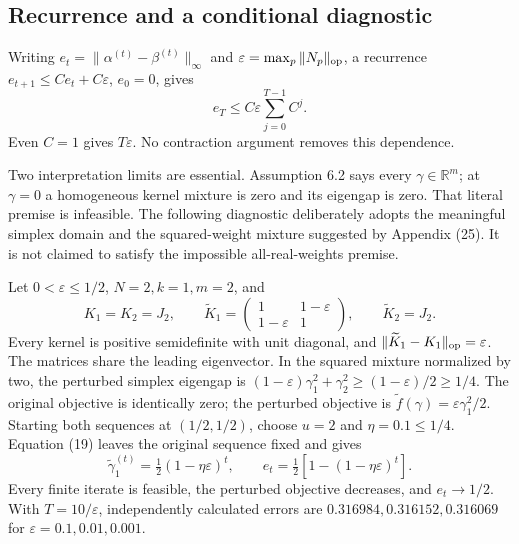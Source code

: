 \documentclass[10pt]{article}
\begin{document}
\subsection*{Recurrence and a conditional diagnostic}
Writing \(e_t=\|\alpha^{(t)}-\beta^{(t)}\|_\infty\) and \(\varepsilon=\max_p\|N_p\|_{\rm op}\), a recurrence \(e_{t+1}\leq C e_t+C\varepsilon\), \(e_0=0\), gives \[e_T\leq C\varepsilon\sum_{j=0}^{T-1}C^j.\] Even \(C=1\) gives \(T\varepsilon\). No contraction argument removes this dependence.\par
Two interpretation limits are essential. Assumption 6.2 says every \(\gamma\in\mathbb R^m\); at \(\gamma=0\) a homogeneous kernel mixture is zero and its eigengap is zero. That literal premise is infeasible. The following diagnostic deliberately adopts the meaningful simplex domain and the squared-weight mixture suggested by Appendix (25). It is not claimed to satisfy the impossible all-real-weights premise.\par
Let \(0<\varepsilon\leq1/2\), \(N=2,k=1,m=2\), and \[K_1=K_2=J_2,\qquad
 \widetilde K_1=\begin{pmatrix}1&1-\varepsilon\\1-\varepsilon&1\end{pmatrix},
 \qquad \widetilde K_2=J_2.\] Every kernel is positive semidefinite with unit diagonal, and \(\|\widetilde K_1-K_1\|_{\rm op}=\varepsilon\). The matrices share the leading eigenvector. In the squared mixture normalized by two, the perturbed simplex eigengap is \((1-\varepsilon)\gamma_1^2+\gamma_2^2\geq(1-\varepsilon)/2\geq1/4\). The original objective is identically zero; the perturbed objective is \(\widetilde f(\gamma)=\varepsilon\gamma_1^2/2\). Starting both sequences at \((1/2,1/2)\), choose \(u=2\) and \(\eta=0.1\leq1/4\). Equation (19) leaves the original sequence fixed and gives \[\widetilde\gamma_1^{(t)}=\tfrac12(1-\eta\varepsilon)^t,\qquad
 e_t=\tfrac12[1-(1-\eta\varepsilon)^t].\] Every finite iterate is feasible, the perturbed objective decreases, and \(e_t\to1/2\). With \(T=10/\varepsilon\), independently calculated errors are \(0.316984,0.316152,0.316069\) for \(\varepsilon=0.1,0.01,0.001\).\par
\end{document}
